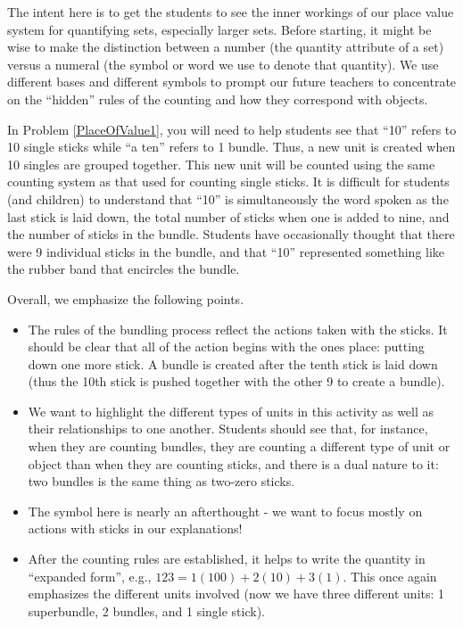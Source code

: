 \documentclass{ximera}
\begin{document}
\newpage
\begin{instructorNotes}
The intent here is to get the students to see the inner workings of our 
place value system for quantifying sets, especially larger sets.  Before starting, it might be wise to make the distinction between a number (the quantity attribute of a set) versus a numeral (the symbol or word we use to denote that quantity). We use different bases and different symbols to prompt our future teachers 
to concentrate on the ``hidden'' rules of the counting and how they correspond with objects.

In Problem \ref{PlaceOfValue1}, you will need to help students see that ``10'' refers to 10 single sticks while ``a ten'' refers to 1 bundle.  Thus, a new unit is created when 10 singles are grouped together.  This new unit will be counted using the same counting system as that used for counting single sticks.  It is difficult for students (and children) to understand that ``10'' is simultaneously the word spoken as the last stick is laid down, the total number of sticks when one is added to nine, and the number of sticks in the bundle.  Students have occasionally thought that there were 9 individual sticks in the bundle, and that ``10'' represented something like the rubber band that encircles the bundle.

Overall, we emphasize the following points.
\begin{itemize}
	\item The rules of the bundling process reflect the actions taken with the sticks. It should be clear that all of the action begins with the ones place:  putting down one more stick. 
	A bundle is created after the tenth stick is laid down (thus the 10th stick is pushed together with the other 9 to create a bundle).
		\item We want to highlight the different types of units in this activity as well as their relationships to one another.  Students should see that, for instance, when they are counting bundles, they are counting a different type of unit or object than when they are counting sticks, and there is a dual nature to it: two bundles is the same thing as two-zero sticks.
	\item The symbol here is nearly an afterthought - we want to focus mostly on actions with sticks in our explanations!
	\item After the counting rules are established, it helps to write the quantity in ``expanded form'', e.g., $123 = 1(100) + 2(10) + 3(1)$. This once again emphasizes the different units involved (now we have three different units: 1 superbundle, 2 bundles, and 1 single stick).


\end{itemize}
\end{instructorNotes}
\end{document}
